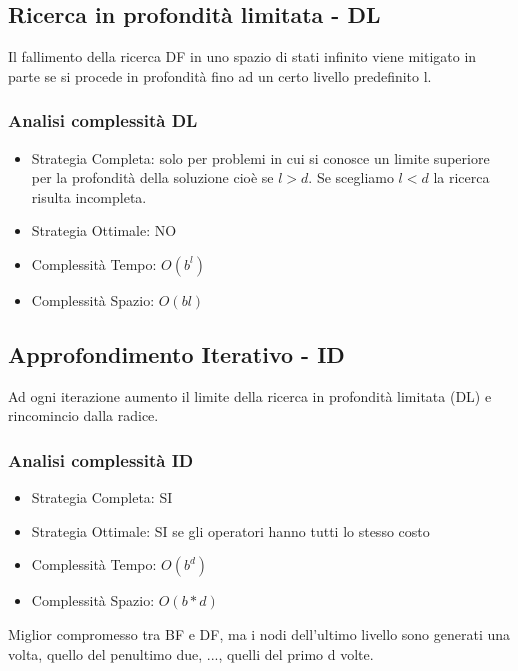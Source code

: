 \documentclass{article}
\begin{document}
\subsection{Ricerca in profondità limitata - DL}
Il fallimento della ricerca DF in uno spazio di stati infinito viene mitigato in parte se si procede in profondità fino ad un certo livello predefinito l.
\subsubsection{Analisi complessità DL}
\begin{itemize}
    \item Strategia Completa: solo per problemi in cui si conosce un limite superiore per la profondità della soluzione cioè se $l>d$. Se scegliamo $l < d$ la ricerca risulta incompleta.
    \item Strategia Ottimale: NO
    \item Complessità Tempo: $O(b^l)$
    \item Complessità Spazio: $O(bl)$
\end{itemize}

\subsection{Approfondimento Iterativo - ID}
Ad ogni iterazione aumento il limite della ricerca in profondità limitata (DL) e rincomincio dalla radice.
\subsubsection{Analisi complessità ID}
\begin{itemize}
    \item Strategia Completa: SI
    \item Strategia Ottimale: SI se gli operatori hanno tutti lo stesso costo
    \item Complessità Tempo: $O(b^d)$
    \item Complessità Spazio: $O(b*d)$
\end{itemize}
Miglior compromesso tra BF e DF, ma i nodi dell'ultimo livello sono generati una volta, quello del penultimo due, ..., quelli del primo d volte.
\end{document}
